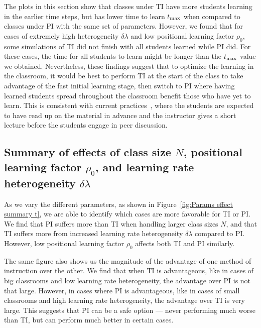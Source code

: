 \documentclass[twocolumn,secnumarabic,amssymb, nobibnotes, aps, prd]{revtex4-2}
\begin{document}
    The plots in this section show that classes under TI have more students learning in the earlier time steps, but has lower time to learn $t_{\rm max}$ when compared to classes under PI with the same set of parameters.
    However, we found that for cases of extremely high heterogeneity $\delta\lambda$ and low positional learning factor $\rho_0$, some simulations of TI did not finish with all students learned while PI did.
    For these cases, the time for all students to learn might be longer than the $t_{\rm max}$ value we obtained.
    Nevertheless, these findings suggest that to optimize the learning in the classroom, it would be best to perform TI at the start of the class to take advantage of the fast initial learning stage, then switch to PI where having learned students spread throughout the classroom benefit those who have yet to learn.
    This is consistent with current practices~\cite{mazur1997peer,smith2009peer,lasry2008peer,roxas2010seating}, where the students are expected to have read up on the material in advance and the instructor gives a short lecture before the students engage in peer discussion.

    \subsection{Summary of effects of class size $N$, positional learning factor $\rho_0$, and learning rate heterogeneity $\delta\lambda$}
        
        As we vary the different parameters, as shown in Figure~\ref{fig:Params effect summary t}, we are able to identify which cases are more favorable for TI or PI.
        We find that PI suffers more than TI when handling larger class sizes $N$, and that TI suffers more from increased learning rate heterogeneity $\delta\lambda$ compared to PI.
        However, low positional learning factor $\rho_0$ affects both TI and PI similarly.

        The same figure also shows us the magnitude of the advantage of one method of instruction over the other.
        We find that when TI is advantageous, like in cases of big classrooms and low learning rate heterogeneity, the advantage over PI is not that large.
        However, in cases where PI is advantageous, like in cases of small classrooms and high learning rate heterogeneity, the advantage over TI is very large.
        This suggests that PI can be a safe option --- never performing much worse than TI, but can perform much better in certain cases.
\end{document}
